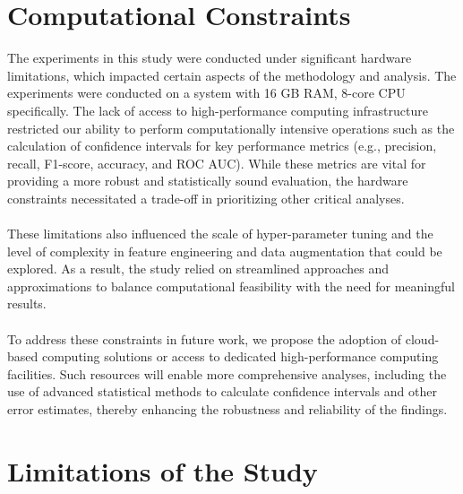 \documentclass[a4paper]{article}
\begin{document}
\section{Computational Constraints}

The experiments in this study were conducted under significant hardware limitations, which impacted certain aspects of the methodology and analysis.  The experiments were conducted on a system with 16 GB RAM, 8-core CPU specifically. The lack of access to high-performance computing infrastructure restricted our ability to perform computationally intensive operations such as the calculation of confidence intervals for key performance metrics (e.g., precision, recall, F1-score, accuracy, and ROC AUC). While these metrics are vital for providing a more robust and statistically sound evaluation, the hardware constraints necessitated a trade-off in prioritizing other critical analyses. \\\\ These limitations also influenced the scale of hyper-parameter tuning and the level of complexity in feature engineering and data augmentation that could be explored. As a result, the study relied on streamlined approaches and approximations to balance computational feasibility with the need for meaningful results. \\\\To address these constraints in future work, we propose the adoption of cloud-based computing solutions or access to dedicated high-performance computing facilities. Such resources will enable more comprehensive analyses, including the use of advanced statistical methods to calculate confidence intervals and other error estimates, thereby enhancing the robustness and reliability of the findings.

\section{Limitations of the Study}
\end{document}
